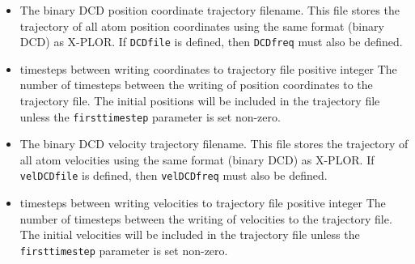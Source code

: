 \begin{itemize}
\item
{}
{
The binary DCD position coordinate trajectory filename.  
This file stores the trajectory of all atom position coordinates 
using the same format (binary DCD) as X-PLOR.  
If {\tt DCDfile} is defined, then {\tt DCDfreq} must also be defined.  
}

\item
{}
{timesteps between writing coordinates to trajectory file}
{positive integer}
{
The number of timesteps between the writing of position coordinates 
to the trajectory file.  
The initial positions will be included in the trajectory file unless
the {\tt firsttimestep} parameter is set non-zero.
}

\item
{}
{
The binary DCD velocity trajectory filename.  
This file stores the trajectory of 
all atom velocities using the same format (binary DCD) as X-PLOR.  
If {\tt velDCDfile} is defined, then {\tt velDCDfreq} must also 
be defined.  
}

\item
{}
{timesteps between writing velocities to trajectory file}
{positive integer}
{
The number of timesteps between the writing of 
velocities to the trajectory file.  
The initial velocities will be included in the trajectory file unless
the {\tt firsttimestep} parameter is set non-zero.
}

%
%
%


\end{itemize}
